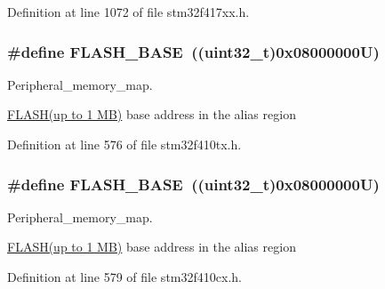 Definition at line 1072 of file stm32f417xx.\+h.

\subsubsection[{\texorpdfstring{F\+L\+A\+S\+H\+\_\+\+B\+A\+SE}{FLASH_BASE}}]{\setlength{\rightskip}{0pt plus 5cm}\#define F\+L\+A\+S\+H\+\_\+\+B\+A\+SE~((uint32\+\_\+t)0x08000000\+U)}\hypertarget{group___peripheral__registers__structures_ga23a9099a5f8fc9c6e253c0eecb2be8db}{}\label{group___peripheral__registers__structures_ga23a9099a5f8fc9c6e253c0eecb2be8db}


Peripheral\+\_\+memory\+\_\+map. 

\hyperlink{group___peripheral__declaration_ga844ea28ba1e0a5a0e497f16b61ea306b}{F\+L\+A\+S\+H(up to 1 M\+B)} base address in the alias region 

Definition at line 576 of file stm32f410tx.\+h.

\subsubsection[{\texorpdfstring{F\+L\+A\+S\+H\+\_\+\+B\+A\+SE}{FLASH_BASE}}]{\setlength{\rightskip}{0pt plus 5cm}\#define F\+L\+A\+S\+H\+\_\+\+B\+A\+SE~((uint32\+\_\+t)0x08000000\+U)}\hypertarget{group___peripheral__registers__structures_ga23a9099a5f8fc9c6e253c0eecb2be8db}{}\label{group___peripheral__registers__structures_ga23a9099a5f8fc9c6e253c0eecb2be8db}


Peripheral\+\_\+memory\+\_\+map. 

\hyperlink{group___peripheral__declaration_ga844ea28ba1e0a5a0e497f16b61ea306b}{F\+L\+A\+S\+H(up to 1 M\+B)} base address in the alias region 

Definition at line 579 of file stm32f410cx.\+h.


